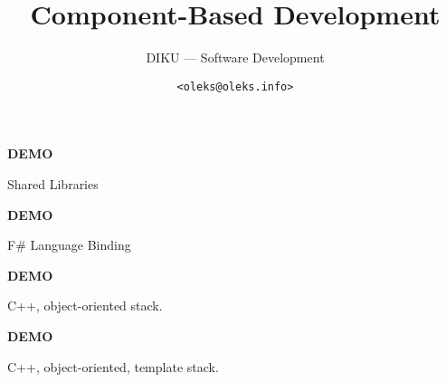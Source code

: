 \documentclass[xcolor=table]{beamer}
\title{Component-Based Development}
\subtitle{DIKU --- Software Development}
\author{\texttt{<oleks@oleks.info>}}
\begin{document}
\begin{frame} \titlepage \end{frame}






\begin{frame}

\begin{center}

\Huge \textbf{DEMO}

\bigskip

\large Shared Libraries

\end{center}

\end{frame}


\begin{frame}

\begin{center}

\Huge \textbf{DEMO}

\bigskip

\large F\# Language Binding

\end{center}

\end{frame}





\begin{frame}

\begin{center}

\Huge \textbf{DEMO}

\bigskip

\large C++, object-oriented stack.

\end{center}

\end{frame}


\begin{frame}

\begin{center}

\Huge \textbf{DEMO}

\bigskip

\large C++, object-oriented, template stack.

\end{center}

\end{frame}



\end{document}
